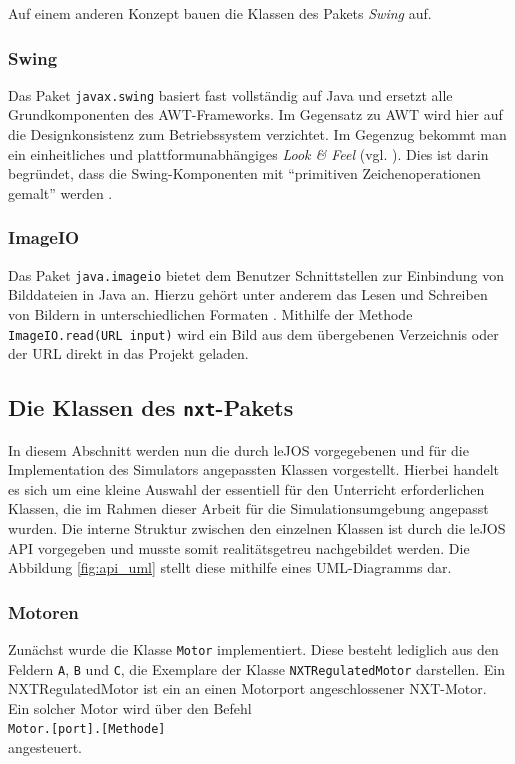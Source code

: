 \documentclass[paper=a4, DIV=calc, BCOR=12mm, twoside=on, onecolumn=on, open = right, titlepage =on, parskip =half-, headsepline = on, footsepline = off, chapterprefix = off, appendixprefix = on, fontsize = 12pt, numbers = noenddot, abstract = on]{scrbook}
\begin{document}
Auf einem anderen Konzept bauen die Klassen des Pakets \emph{Swing} auf. 

\subsubsection*{Swing}

Das Paket \texttt{javax.swing} basiert fast vollständig auf Java und ersetzt alle Grundkomponenten des AWT-Frameworks. Im Gegensatz zu AWT wird hier auf die Designkonsistenz zum Betriebssystem verzichtet. Im Gegenzug bekommt man ein einheitliches und plattformunabhängiges \emph{Look \& Feel} (vgl. \cite[S.279]{abts:15}). Dies ist darin begründet, dass die Swing-Komponenten mit "`primitiven Zeichenoperationen gemalt"' werden \cite[S.1018]{ullenboom:12}.


\subsubsection*{ImageIO}

Das Paket \texttt{java.imageio} bietet dem Benutzer Schnittstellen zur Einbindung von Bilddateien in Java an. Hierzu gehört unter anderem das Lesen und Schreiben von Bildern in unterschiedlichen Formaten \cite[S.1280]{ullenboom:12}. Mithilfe der Methode \texttt{ImageIO.read(URL input)} wird ein Bild aus dem übergebenen Verzeichnis oder der URL direkt in das Projekt geladen. 


\par \singlespacing
\subsection{Die Klassen des \texttt{nxt}-Pakets}
\label{sec:API}
\onehalfspacing
In diesem Abschnitt werden nun die durch leJOS vorgegebenen und für die Implementation des Simulators angepassten Klassen vorgestellt. Hierbei handelt es sich um eine kleine Auswahl der essentiell für den Unterricht erforderlichen Klassen, die im Rahmen dieser Arbeit für die Simulationsumgebung angepasst wurden. Die interne Struktur zwischen den einzelnen Klassen ist durch die leJOS API vorgegeben und musste somit realitätsgetreu nachgebildet werden. Die Abbildung \ref{fig:api_uml} stellt diese mithilfe eines UML-Diagramms dar.

\subsubsection{Motoren}
Zunächst wurde die Klasse \texttt{Motor} implementiert. Diese besteht lediglich aus den Feldern \texttt{A}, \texttt{B} und \texttt{C}, die Exemplare der Klasse \texttt{NXTRegulatedMo\-tor} darstellen. Ein NXTRegulatedMotor ist ein an einen Motorport angeschlossener NXT-Motor. Ein solcher Motor wird über den Befehl\\
\hspace*{2em} \texttt{Motor.[port].[Methode]}\\
angesteuert. 
\end{document}
